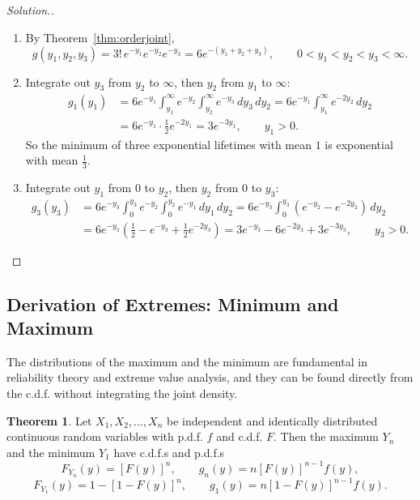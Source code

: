 \documentclass[12pt,a4paper]{report}
\theoremstyle{definition}
\newtheorem{thm}{Theorem}[section]
\theoremstyle{plain}
\newenvironment{solution}
  {\renewcommand{\qedsymbol}{}\begin{proof}[\textit{Solution}.]}
  {\end{proof}}
\begin{document}
\begin{solution}
\begin{enumerate}
\item[(i)] By Theorem~\ref{thm:orderjoint},
\[g(y_1, y_2, y_3) = 3!\, e^{-y_1}e^{-y_2}e^{-y_3} = 6 e^{-(y_1 + y_2 + y_3)},
\qquad 0 < y_1 < y_2 < y_3 < \infty .\]

\item[(ii)] Integrate out $y_3$ from $y_2$ to $\infty$, then $y_2$ from $y_1$ to
$\infty$:
\begin{align*}
g_1(y_1) &= 6e^{-y_1} \int_{y_1}^{\infty} e^{-y_2}\int_{y_2}^{\infty} e^{-y_3}\,
dy_3 \, dy_2 = 6e^{-y_1} \int_{y_1}^{\infty} e^{-2y_2}\, dy_2\\
&= 6e^{-y_1}\cdot\frac{1}{2}e^{-2y_1} = 3e^{-3y_1},\qquad y_1 > 0 .
\end{align*}
So the minimum of three exponential lifetimes with mean $1$ is exponential with
mean $\frac13$.

\item[(iii)] Integrate out $y_1$ from $0$ to $y_2$, then $y_2$ from $0$ to
$y_3$:
\begin{align*}
g_3(y_3) & = 6e^{-y_3} \int_{0}^{y_3} e^{-y_2}\int_0^{y_2}e^{-y_1}\,dy_1\,dy_2 =
6e^{-y_3} \int_{0}^{y_3} (e^{-y_2} - e^{-2y_2})\, dy_2\\
& = 6e^{-y_3} \left( \frac{1}{2} - e^{-y_3} + \frac{1}{2}e^{-2y_3} \right) =
3e^{-y_3} - 6e^{-2y_3} + 3e^{-3y_3},\qquad y_3 > 0 .
\end{align*}
\end{enumerate}
\end{solution}

\subsection{Derivation of Extremes: Minimum and Maximum}

The distributions of the maximum and the minimum are fundamental in reliability
theory and extreme value analysis, and they can be found directly from the
c.d.f. without integrating the joint density.

\begin{thm}
\label{thm:extremes}
Let $X_1, X_2, \dots, X_n$ be independent and identically distributed continuous
random variables with p.d.f. $f$ and c.d.f. $F$. Then the maximum $Y_n$ and the
minimum $Y_1$ have c.d.f.s and p.d.f.s
\[F_{Y_n}(y) = [F(y)]^n ,\qquad g_n(y) = n[F(y)]^{n-1} f(y) ,\]
\[F_{Y_1}(y) = 1 - [1 - F(y)]^n ,\qquad g_1(y) = n[1 - F(y)]^{n-1} f(y) .\]
\end{thm}
\end{document}
